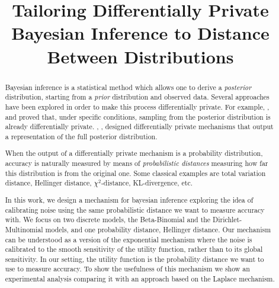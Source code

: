 \documentclass[sigconf]{acmart}
\begin{document}
\title{Tailoring Differentially Private Bayesian Inference to Distance Between Distributions}


\begin{abstract} Bayesian inference is a statistical method which
allows one to derive a \emph{posterior} distribution,
starting from a \emph{prior} distribution and observed data. Several
approaches have been explored in order to make this process differentially
private. For example, \citet{dimitrakakis2014robust}, and
\citet{wang2015privacy} proved that, under specific conditions, sampling from
the posterior distribution is already differentially private. \citet{zhang2016differential}, \citet{foulds2016theory},
designed differentially private mechanisms that output a
representation of the full posterior distribution. 

When the output of a differentially private mechanism is a probability
distribution, accuracy is naturally measured by means of
\emph{probabilistic distances} measuring how far this distribution is
from the original one. Some classical examples are total variation distance,
Hellinger distance, $\chi^2$-distance, KL-divergence, etc.

In this work, we design a mechanism for
bayesian inference exploring the idea of calibrating noise using the
same probabilistic distance we want to measure accuracy with. 
We focus on two discrete models, the Beta-Binomial and the
Dirichlet-Multinomial models, and one probability distance, Hellinger distance. 
Our mechanism can be understood as a version of  the exponential mechanism
where the noise is calibrated to the smooth sensitivity of the
utility function, rather than to its global sensitivity. In our
setting, the utility function is the probability distance we want to
use to measure accuracy. To show the usefulness of this mechanism we
show an experimental analysis comparing it with an approach based on
the Laplace mechanism.
\end{abstract}



\end{document}

